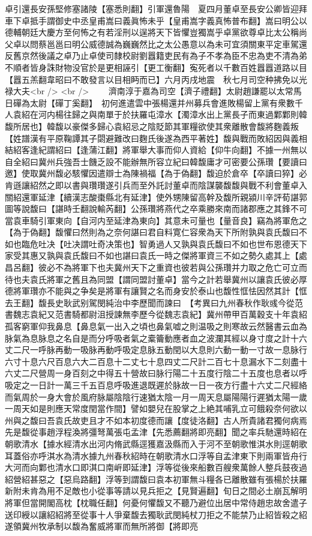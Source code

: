 卓引還長安孫堅修塞諸陵【塞悉則翻】引軍還魯陽　夏四月董卓至長安公卿皆迎拜車下卓抵手謂御史中丞皇甫嵩曰義眞怖未乎【皇甫嵩字義真怖普布翻】嵩曰明公以德輔朝廷大慶方至何怖之有若淫刑以逞將天下皆懼豈獨嵩乎卓黨欲尊卓比太公稱尚父卓以問蔡邕邕曰明公威德誠為巍巍然比之太公愚意以為未可宜須關東平定車駕還反舊京然後議之卓乃止卓使司隸校尉劉囂籍吏民有為子不孝為臣不忠為吏不清為弟不順者皆身誅財物没官於是更相誣引【更工衡翻】寃死者以千數百姓囂囂道路以目【囂五羔翻韋昭曰不敢發言以目相眄而已】六月丙戌地震　秋七月司空种拂免以光禄大夫<br />
<br />
　　濟南淳于嘉為司空【濟子禮翻】太尉趙謙罷以太常馬日磾為太尉【磾丁奚翻】　初何進遣雲中張楊還并州募兵會進敗楊留上黨有衆數千人袁紹在河内楊往歸之與南單于於扶羅屯漳水【濁漳水出上黨長子而東過鄴鄴則韓馥所居也】韓馥以豪傑多歸心袁紹忌之陰貶節其軍糧欲使其衆離散會馥將麴義叛【姓譜漢有平原鞠譚其子閟避難改曰麴氏後遂為西平著姓】馥與戰而敗紹因與義相結紹客逢紀謂紹曰【逢蒲江翻】將軍舉大事而仰人資給【仰牛向翻】不據一州無以自全紹曰冀州兵強吾士饑乏設不能辦無所容立紀曰韓馥庸才可密要公孫瓚【要讀曰邀】使取冀州馥必駭懼因遣辯士為陳禍福【為于偽翻】馥迫於倉卒【卒讀曰猝】必肯遜讓紹然之即以書與瓚瓚遂引兵而至外託討董卓而陰謀襲馥馥與戰不利會董卓入關紹還軍延津【續漢志酸棗縣北有延津】使外甥陳留高幹及馥所親潁川辛評荀諶郭圖等說馥曰【諶時壬翻說輸芮翻】公孫瓚將燕代之卒乘勝來南而諸郡應之其鋒不可當袁車騎引軍東向【自河内至延津為東向】其意未可量也【量音良】竊為將軍危之【為于偽翻】馥懼曰然則為之奈何諶曰君自料寛仁容衆為天下所附孰與袁氏馥曰不如也臨危吐决【吐决謂吐奇决策也】智勇過人又孰與袁氏馥曰不如也世布恩德天下家受其惠又孰與袁氏馥曰不如也諶曰袁氏一時之傑將軍資三不如之勢久處其上【處昌呂翻】彼必不為將軍下也夫冀州天下之重資也彼若與公孫瓚并力取之危亡可立而待也夫袁氏將軍之舊且為同盟【謂同盟討董卓】當今之計若舉冀州以讓袁氏彼必厚德將軍瓚亦不能與之争矣是將軍有讓賢之名而身安於泰山也馥性恇怯因然其計【恇去王翻】馥長史耿武别駕閔純治中李歷聞而諫曰　【考異曰九州春秋作耿彧今從范書魏志袁紀又范書騎都尉沮授諫無李歷今從魏志袁紀】冀州帶甲百萬穀支十年袁紹孤客窮軍仰我鼻息【鼻息氣一出入之頃也鼻氣嘘之則温吸之則寒故云然醫書云血為脉氣為息脉息之名自是而分呼吸者氣之槖籥動應者血之波瀾其經以身寸度之計十六丈二尺一呼脉再動一吸脉再動呼吸定息脉五動閏以大息則六動一動一寸故一息脉行六寸十息六尺百息六大二百息十二丈七十息四丈二尺計二百七十息漏水下二刻盡十六丈二尺營周一身百刻之中得五十營故曰脉行陽二十五度行陰二十五度也息者以呼吸定之一日計一萬三千五百息呼吸進退既遲於脉故一日一夜方行盡十六丈二尺經絡而氣周於一身大會於風府脉屬陰陰行速猶太陰一月一周天息屬陽陽行遲猶太陽一歲一周天如是則應天常度閏當作間】譬如嬰兒在股掌之上絶其哺乳立可餓殺奈何欲以州與之馥曰吾袁氏故吏且才不如本初度德而讓【度徒洛翻】古人所貴諸君獨何病焉先是馥從事趙浮程渙將彊弩萬張屯孟津【先悉薦翻將即亮翻】聞之率兵馳還時紹在朝歌清水【據水經清水出河内脩武縣逕獲嘉汲縣而入于河不至朝歌惟淇水則逕朝歌耳蓋俗亦呼淇水為清水據九州春秋紹時在朝歌清水口浮等自孟津東下則兩軍皆舟行大河而向鄴也清水口即淇口南㟁即延津】浮等從後來船數百艘衆萬餘人整兵鼓夜過紹營紹甚惡之【惡烏路翻】浮等到謂馥曰袁本初軍無斗糧各已離散雖有張楊於扶羅新附未肯為用不足敵也小從事等請以見兵拒之【見賢遍翻】旬日之間必土崩瓦解明將軍但當開閣高枕【枕職任翻】何憂何懼馥又不聽乃避位出居中常侍趙忠故舍遣子送印綬以讓紹紹將至從事十人爭棄馥去獨耿武閔純杖刀拒之不能禁乃止紹皆殺之紹遂領冀州牧承制以馥為奮威將軍而無所將御【將即亮